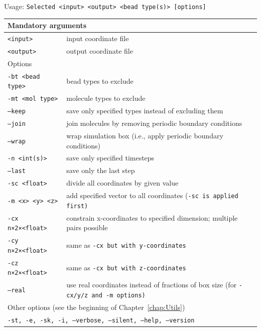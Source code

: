 \vspace{1em}
\noindent
Usage: \tt{Selected <input> <output> <bead type(s)> [options]}
\noindent
\begin{longtable}{p{}p{}}
  \toprule
  \multicolumn{2}{l}{Mandatory arguments}\\
  \midrule
  \tt{<input>}        & input coordinate file\\
  \tt{<output>}       & output coordinate file\\
  \midrule
  \multicolumn{2}{l}{Options}\\
  \midrule
  \tt{-bt <bead type>} & bead types to exclude\\
  \tt{-mt <mol type>}  & molecule types to exclude\\
  \tt{--keep}          & save only specified types instead of excluding them\\
  \tt{--join}          & join molecules by removing periodic boundary
                         conditions\\
  \tt{--wrap}          & wrap simulation box (i.e., apply periodic boundary
                         conditions)\\
  \tt{-n <int(s)>}     & save only specified timesteps\\
  \tt{--last}          & save only the last step\\
  \tt{-sc <float>}     & divide all coordinates by given value\\
  \tt{-m <x> <y> <z>}  & add specified vector to all coordinates (\tt{-sc} is
                         applied first)\\
  \tt{-cx n×2×<float>} & constrain x-coordinates to specified dimension;
                         multiple pairs possible\\
  \tt{-cy n×2×<float>} & same as \tt{-cx} but with y-coordinates\\
  \tt{-cz n×2×<float>} & same as \tt{-cx} but with z-coordinates\\
  \tt{--real}          & use real coordinates instead of fractions of box size
                         (for \tt{-cx/y/z} and \tt{-m} options)\\
  \midrule
  \multicolumn{2}{l}{Other options (see the beginning of
                     Chapter~\ref{chap:Utils})}\\
  \midrule
  \multicolumn{2}{p{0.948\textwidth}}{\tt{-st},
                                      \tt{-e},
                                      \tt{-sk},
                                      \tt{-i},
                                      \tt{--verbose},
                                      \tt{--silent},
                                      \tt{--help},
                                      \tt{--version}}\\
  \bottomrule
\end{longtable}
